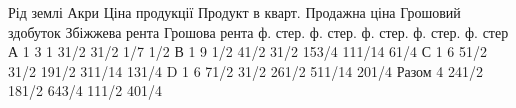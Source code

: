 Рід землі    Акри    Ціна продукції    Продукт в кварт. Продажна  ціна    Грошовий  здобуток   
Збіжжева рента    Грошова  рента
        ф. стер. ф. стер. ф. стер. ф. стер. ф. стер
А                    1    3             1            31/2       31/2        1/7            1/2
В                    1    9 1/2       41/2    31/2       153/4        111/14    61/4
С                    1    6             51/2    31/2        191/2        311/14    131/4
D                    1    6             71/2    31/2        261/2        511/14     201/4
Разом           4    241/2    181/2           643/4    111/2            401/4
